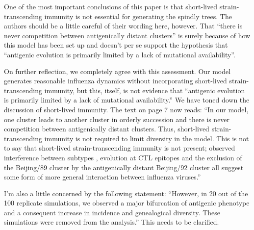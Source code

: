 \documentclass[11pt,oneside,letterpaper]{article}
\def\comment#1{
#1
}
\def\response#1{
\begin{bf}
#1
\end{bf}
}
\def\break{\vspace{0.2cm}}
\begin{document}
\break

\comment{One of the most important conclusions of this paper is that short-lived strain-transcending immunity is not essential for generating the spindly trees. The authors should be a little careful of their wording here, however. That ``there is never competition between antigenically distant clusters'' is surely because of how this model has been set up and doesn't per se support the hypothesis that ``antigenic evolution is primarily limited by a lack of mutational availability''.}

\response{On further reflection, we completely agree with this assessment.  Our model generates reasonable influenza dynamics without incorporating short-lived strain-transcending immunity, but this, itself, is not evidence that ``antigenic evolution is primarily limited by a lack of mutational availability.''  We have toned down the discussion of short-lived immunity.  The text on page 7 now reads: ``In our model, one cluster leads to another cluster in orderly succession and there is never competition between antigenically distant clusters.  Thus, short-lived strain-transcending immunity is not required to limit diversity in the model.  This is not to say that short-lived strain-transcending immunity is not present; observed interference between subtypes \cite{Ferguson03,Goldstein11}, evolution at CTL epitopes \cite{Voeten00} and the exclusion of the Beijing/89 cluster by the antigenically distant Beijing/92 cluster \cite{Smith04} all suggest some form of more general interaction between influenza viruses.''}

\break

\comment{I'm also a little concerned by the following statement: ``However, in 20 out of the 100 replicate simulations, we observed a major bifurcation of antigenic phenotype and a consequent increase in incidence and genealogical diversity. These simulations were removed from the analysis.'' This needs to be clarified.}
\end{document}
